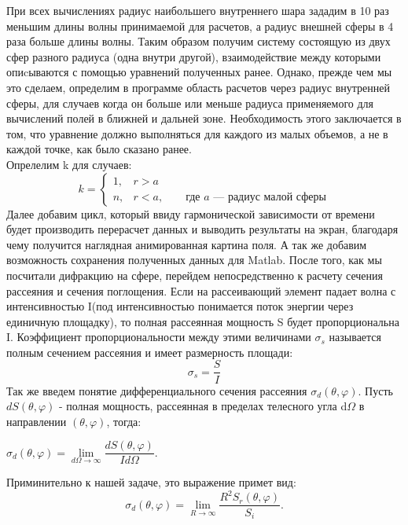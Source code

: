 При всех вычислениях радиус наибольшего внутреннего шара зададим в 10 раз меньшим длины волны принимаемой для расчетов, а радиус внешней сферы в 4 раза больше длины волны. Таким образом получим систему состоящую из двух сфер разного радиуса (одна внутри другой), взаимодействие между которыми опиcываются с помощью уравнений полученных ранее. Однако, прежде чем мы это сделаем, определим в программе область расчетов через радиус внутренней сферы, для случаев когда он больше или меньше радиуса применяемого для вычислений полей в ближней и дальней зоне. Необходимость этого заключается в том, что уравнение должно выполняться для каждого из малых объемов, а не в каждой точке, как было сказано ранее.
\\
Опрелелим k для случаев:
\begin{equation}
	k = 
	\begin{cases}
		1, & r > a\\
		n, & r < a ,\qquad \text{где }a \text{ --- радиус малой сферы}
	\end{cases}
\end{equation}
Далее добавим цикл, который ввиду гармонической зависимости от времени будет производить перерасчет данных и выводить результаты на экран, благодаря чему получится наглядная анимированная картина поля. А так же добавим возможность сохранения полученных данных для Matlab. После того, как мы посчитали дифракцию на сфере, перейдем непосредственно к расчету сечения рассеяния и сечения поглощения. Если на рассеивающий элемент падает волна с интенсивностью I(под интенсивностью понимается поток энергии через единичную площадку), то полная рассеянная мощность S будет пропорциональна I. Коэффициент пропорциональности между этими величинами $ \sigma_s $ называется полным сечением рассеяния и имеет размерность площади:
\begin{equation}
	\sigma_s = \dfrac{S}{I} 
\end{equation}
Так же введем понятие дифференциального сечения рассеяния
 $ \sigma_d(\theta,\varphi) $. Пусть $ dS(\theta, \varphi) $ - полная мощность, рассеянная в пределах телесного угла d$ \Omega $ в направлении $ (\theta,\varphi) $, тогда:
 \begin{center}
 	$ \sigma_d(\theta,\varphi) = \lim\limits_{d\Omega\rightarrow\infty} \dfrac{dS(\theta, \varphi)}{Id\Omega}. $
 \end{center}
Приминительно к нашей задаче, это выражение примет вид:
\begin{equation}
\sigma_d(\theta,\varphi) = \lim\limits_{R\rightarrow\infty} \dfrac{R^2 S_r(\theta, \varphi)}{S_i}.
\end{equation}
